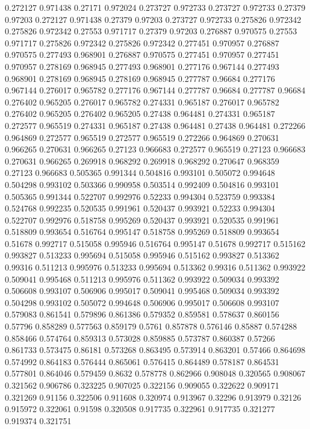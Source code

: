 0.272127 0.971438
0.27171 0.972024
0.273727 0.972733
0.273727 0.972733
0.27379 0.97203
0.272127 0.971438
0.27379 0.97203
0.273727 0.972733
0.275826 0.972342
0.275826 0.972342
0.27553 0.971717
0.27379 0.97203
0.276887 0.970575
0.27553 0.971717
0.275826 0.972342
0.275826 0.972342
0.277451 0.970957
0.276887 0.970575
0.277493 0.968901
0.276887 0.970575
0.277451 0.970957
0.277451 0.970957
0.278169 0.968945
0.277493 0.968901
0.277176 0.967144
0.277493 0.968901
0.278169 0.968945
0.278169 0.968945
0.277787 0.96684
0.277176 0.967144
0.276017 0.965782
0.277176 0.967144
0.277787 0.96684
0.277787 0.96684
0.276402 0.965205
0.276017 0.965782
0.274331 0.965187
0.276017 0.965782
0.276402 0.965205
0.276402 0.965205
0.27438 0.964481
0.274331 0.965187
0.272577 0.965519
0.274331 0.965187
0.27438 0.964481
0.27438 0.964481
0.272266 0.964869
0.272577 0.965519
0.272577 0.965519
0.272266 0.964869
0.270631 0.966265
0.270631 0.966265
0.27123 0.966683
0.272577 0.965519
0.27123 0.966683
0.270631 0.966265
0.269918 0.968292
0.269918 0.968292
0.270647 0.968359
0.27123 0.966683
0.505365 0.991344
0.504816 0.993101
0.505072 0.994648
0.504298 0.993102
0.503366 0.990958
0.503514 0.992409
0.504816 0.993101
0.505365 0.991344
0.522707 0.992976
0.52233 0.994304
0.523759 0.993384
0.524768 0.992235
0.520535 0.991961
0.520437 0.993921
0.52233 0.994304
0.522707 0.992976
0.518758 0.995269
0.520437 0.993921
0.520535 0.991961
0.518809 0.993654
0.516764 0.995147
0.518758 0.995269
0.518809 0.993654
0.51678 0.992717
0.515058 0.995946
0.516764 0.995147
0.51678 0.992717
0.515162 0.993827
0.513233 0.995694
0.515058 0.995946
0.515162 0.993827
0.513362 0.99316
0.511213 0.995976
0.513233 0.995694
0.513362 0.99316
0.511362 0.993922
0.509041 0.995468
0.511213 0.995976
0.511362 0.993922
0.509034 0.993392
0.506608 0.993107
0.506906 0.995017
0.509041 0.995468
0.509034 0.993392
0.504298 0.993102
0.505072 0.994648
0.506906 0.995017
0.506608 0.993107
0.579083 0.861541
0.579896 0.861386
0.579352 0.859581
0.578637 0.860156
0.57796 0.858289
0.577563 0.859179
0.5761 0.857878
0.576146 0.85887
0.574288 0.858466
0.574764 0.859313
0.573028 0.859885
0.573787 0.860387
0.57266 0.861733
0.573475 0.86181
0.573268 0.863495
0.573914 0.863201
0.57466 0.864698
0.574992 0.864183
0.576444 0.865061
0.576415 0.864489
0.578187 0.864531
0.577801 0.864046
0.579459 0.8632
0.578778 0.862966
0.908048 0.320565
0.908067 0.321562
0.906786 0.323225
0.907025 0.322156
0.909055 0.322622
0.909171 0.321269
0.91156 0.322506
0.911608 0.320974
0.913967 0.32296
0.913979 0.32126
0.915972 0.322061
0.91598 0.320508
0.917735 0.322961
0.917735 0.321277
0.919374 0.321751
